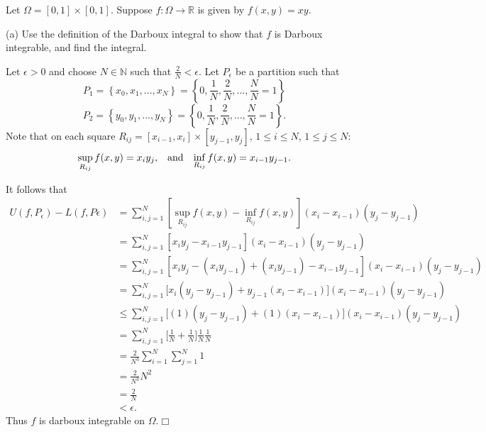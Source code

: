 \documentclass[11pt]{article}
\begin{document}
\newpage

\noindent {\bf [5]} Let $\Omega=[0,1]\times[0,1]$. Suppose $f:\Omega\rightarrow\mathbb{R}$ is given by $f(x,y)=xy$.

\vspace{.1in}

\noindent (a) Use the definition of the Darboux integral to show that $f$ is Darboux integrable, and find the integral.

\vspace{.1in}

\noindent Let $\epsilon>0$ and choose $N\in\mathbb{N}$ such that $\frac{2}{N}<\epsilon$. Let $P_\epsilon$ be a partition such that 
\[
P_1=\left\{x_0,x_1,...,x_N\right\}=\left\{0,\frac{1}{N},\frac{2}{N},...,\frac{N}{N}=1\right\}
\]
\[
P_2=\left\{y_0,y_1,...,y_N\right\}=\left\{0,\frac{1}{N},\frac{2}{N},...,\frac{N}{N}=1\right\}.
\]
\noindent Note that on each square $R_{ij}=[x_{i-1},x_i]\times[y_{j-1},y_j]$, $1\leq i\leq N$, $1\leq j\leq N$:
\[
\begin{array}{c c c} \sup\limits_{R_{ij}}f(x,y)=x_iy_j,	& \text{and}	&	\inf\limits_{R_{ij}}f(x,y)=x_{i-1}y_{j-1}.
\end{array}
\]

\vspace{.1in}

\noindent It follows that
\begin{align*}
U(f,P_\epsilon)-L(f,P\epsilon)&=\sum\limits_{i,j=1}^N\left[\sup\limits_{R_{ij}}f(x,y)-\inf\limits_{R_{ij}}f(x,y)\right]\left(x_i-x_{i-1}\right)\left(y_j-y_{j-1}\right)\\&=\sum\limits_{i,j=1}^N\left[x_iy_j-x_{i-1}y_{j-1}\right]\left(x_i-x_{i-1}\right)\left(y_j-y_{j-1}\right)\\&=\sum\limits_{i,j=1}^N\left[x_iy_j-\left(x_iy_{j-1}\right)+\left(x_iy_{j-1}\right)-x_{i-1}y_{j-1}\right]\left(x_i-x_{i-1}\right)\left(y_j-y_{j-1}\right)\\&=\sum\limits_{i,j=1}^N\Big[x_i\left(y_j-y_{j-1}\right)+y_{j-1}\left(x_i-x_{i-1}\right)\Big]\left(x_i-x_{i-1}\right)\left(y_j-y_{j-1}\right)\\&\leq \sum\limits_{i,j=1}^N\Big[(1)\left(y_j-y_{j-1}\right)+(1)\left(x_i-x_{i-1}\right)\Big]\left(x_i-x_{i-1}\right)\left(y_j-y_{j-1}\right)\\&=\sum\limits_{i,j=1}^N\Big[\frac{1}{N}+\frac{1}{N}\Big]\frac{1}{N}\frac{1}{N}\\&=\frac{2}{N^3}\sum\limits_{i=1}^N\sum\limits_{j=1}^N1\\&=\frac{2}{N^3}N^2\\&=\frac{2}{N}\\&<\epsilon.
\end{align*}
\noindent Thus $f$ is darboux integrable on $\Omega$.\hfill $\Box$
\end{document}
